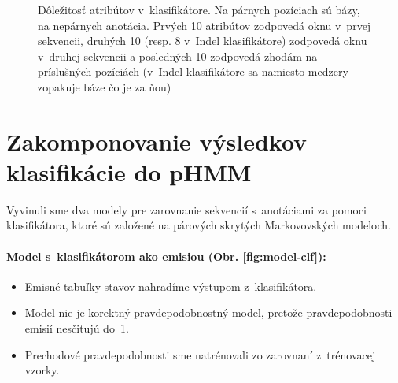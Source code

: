 \documentclass[myposter,portrait]{sciposter}
\def\mysection#1{
{\color{SectionCol}\section*{\sc\bfseries #1}}}
\begin{document}
\begin{multicols*}{3}
\begin{figure}
    \centering
    \label{fig:faeture-importances}
    \caption{Dôležitosť atribútov v~klasifikátore. Na párnych pozíciach sú bázy, na nepárnych anotácia. Prvých 10 atribútov zodpovedá oknu v~prvej sekvencii, druhých 10 (resp. 8 v~Indel klasifikátore) zodpovedá oknu v~druhej sekvencii a posledných 10 zodpovedá zhodám na príslušných pozíciách (v~Indel klasifikátore sa namiesto medzery zopakuje báze čo je za ňou)}
\end{figure}

\mysection{Zakomponovanie výsledkov klasifikácie do pHMM}

Vyvinuli sme dva modely pre zarovnanie sekvencií s~anotáciami za pomoci klasifikátora, ktoré sú založené na párových skrytých Markovovských modeloch.

\paragraph{Model s~klasifikátorom ako emisiou (Obr. \ref{fig:model-clf}):}
\begin{itemize}
    \item Emisné tabuľky stavov nahradíme výstupom z~klasifikátora.
    \item Model nie je korektný pravdepodobnostný model, pretože pravdepodobnosti emisií nesčitujú do~1.
    \item Prechodové pravdepodobnosti sme natrénovali zo zarovnaní z~trénovacej vzorky.
\end{itemize}


\end{multicols*}
\end{document}
